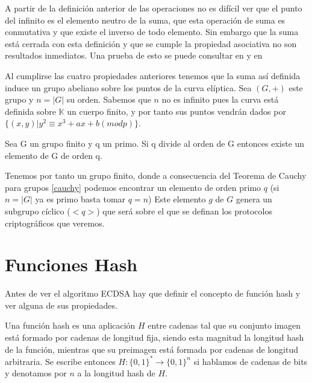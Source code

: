 A partir de la definición anterior de las operaciones no es difícil ver que el punto del infinito es el elemento neutro de la suma, que esta operación de suma es conmutativa y que existe el inverso de todo elemento. Sin embargo que la suma está cerrada con esta definición y que se cumple la propiedad asociativa no son resultados inmediatos. Una prueba de esto se puede consultar en \citep{group_law} y en \citep{group_law_verrill} 

Al cumplirse las cuatro propiedades anteriores tenemos que la suma así definida induce un grupo abeliano sobre los puntos de la curva elíptica. Sea $(G,+)$ este grupo y $n=|G|$ su orden. Sabemos que $n$ no es infinito pues la curva está definida sobre $\mathbb{K}$ un cuerpo finito, y por tanto sus puntos vendrán dados por $\{(x,y)| y^2 \equiv x^3 + ax + b  (mod  p) \}$. 
\theoremstyle{theorem}\begin{theorem}\label{cauchy} Sea G un grupo finito y q un primo. Si q divide al orden de G entonces existe un elemento de G de orden q.
\end{theorem}
Tenemos por tanto un grupo finito, donde a consecuencia del Teorema de Cauchy para grupos \ref{cauchy} podemos encontrar un elemento de orden primo $q$ (si $n = |G|$ ya es primo basta tomar $q = n$) Este elemento $g$ de $G$ genera un subgrupo cíclico ($<q>$) que será sobre el que se definan los protocolos criptográficos que veremos.



\section{Funciones Hash}\label{hash}
Antes de ver el algoritmo ECDSA hay que definir el concepto de función hash y ver alguna de sus propiedades.
\theoremstyle{definition}\begin{definition}\label{hash_def} Una función hash es una aplicación $\textit{H}$ entre cadenas tal que su conjunto imagen está formado por cadenas de longitud fija, siendo esta magnitud la longitud hash de la función, mientras que su preimagen está formada por cadenas de longitud arbitraria. Se escribe entonces $\textit{H}: \{0,1\}^* \rightarrow \{0,1\}^n$ si hablamos de cadenas de bits y denotamos por $n$ a la longitud hash de $\textit{H}$.\end{definition}

